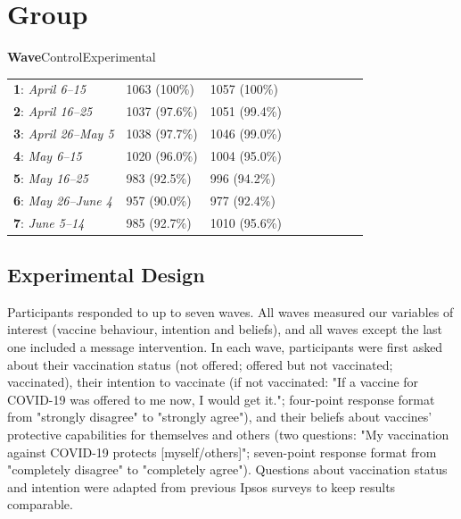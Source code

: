 \documentclass[authordate, empirical]{jote-new-article}
\begin{document}
	\section{Group}



	\textbf{Wave}ControlExperimental

	\begin{table}
		\begin{tabularx}{\linewidth}{@{} l l l l l l l l l @{}}
			\hline \textbf{1}: \emph{April 6–15} & 1063 (100\%) & 1057 (100\%) \\

			 \textbf{2}: \emph{April 16–25} & 1037 (97.6\%) & 1051 (99.4\%) \\

			 \textbf{3}: \emph{April 26–May 5} & 1038 (97.7\%) & 1046 (99.0\%) \\

			 \textbf{4}: \emph{May 6–15} & 1020 (96.0\%) & 1004 (95.0\%) \\

			 \textbf{5}: \emph{May 16–25} & 983 (92.5\%) & 996 (94.2\%) \\

			 \textbf{6}: \emph{May 26–June 4} & 957 (90.0\%) & 977 (92.4\%) \\

			 \textbf{7}: \emph{June 5–14} & 985 (92.7\%) & 1010 (95.6\%) \\


		\end{tabularx}
	\end{table}

	\subsection{Experimental Design}



	Participants responded to up to seven waves. All waves measured our variables of interest (vaccine behaviour, intention and beliefs), and all waves except the last one included a message intervention. In each wave, participants were first asked about their vaccination status (not offered; offered but not vaccinated; vaccinated), their intention to vaccinate (if not vaccinated: "If a vaccine for COVID-19 was offered to me now, I would get it."; four-point response format from "strongly disagree" to "strongly agree"), and their beliefs about vaccines' protective capabilities for themselves and others (two questions: "My vaccination against COVID-19 protects [myself/others]"; seven-point response format from "completely disagree" to "completely agree"). Questions about vaccination status and intention were adapted from previous Ipsos surveys \parencites{Boyon2020} to keep results comparable.
\end{document}
